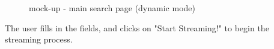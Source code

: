 \documentclass[a4paper,11pt]{report}
\begin{document}
\begin{figure}[H]
\begin{center}
\caption{mock-up - main search page (dynamic mode)}
\end{center}
\end{figure}
\vspace*{\fill}
\newpage
\vspace*{\fill}
The user fills in the fields, and clicks on "Start Streaming!" to begin the streaming process.
\bigskip
\end{document}

